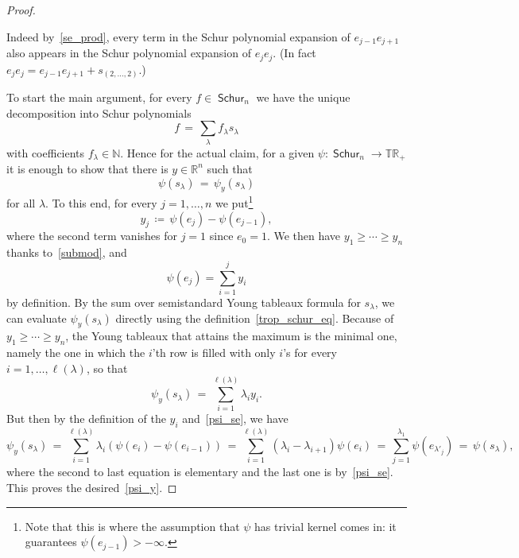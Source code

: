 \documentclass[11pt]{article}
\theoremstyle{definition}
\numberwithin{equation}{section}
\newcommand{\N}{\mathbb{N}}
\newcommand{\R}{\mathbb{R}}
\newcommand{\TR}{\mathbb{TR}}
\DeclareMathOperator{\Schur}{\mathsf{Schur}}
\begin{document}
\begin{proof}
\begin{itemize}
			Indeed by~\eqref{se_prod}, every term in the Schur polynomial expansion of $e_{j-1} e_{j+1}$ also appears in the Schur polynomial expansion of $e_j e_j$. (In fact $e_j e_j = e_{j-1} e_{j+1} + s_{\scriptstyle{(2,\ldots,2)}}$.)
	\end{itemize}
	To start the main argument, for every $f \in \Schur_n$ we have the unique decomposition into Schur polynomials
	\[
		f \,=\, \sum_\lambda f_\lambda s_\lambda
	\]
	with coefficients $f_\lambda \in \N$. Hence for the actual claim, for a given $\psi : \Schur_n \to \TR_+$ it is enough to show that there is $y \in \R^n$ such that
	\begin{equation}
		\label{psi_y}
		\psi(s_\lambda) \,=\, \psi_y(s_\lambda)
	\end{equation}
	for all $\lambda$. To this end, for every $j = 1,\ldots,n$ we put\footnote{Note that this is where the assumption that $\psi$ has trivial kernel comes in: it guarantees $\psi(e_{j-1}) > -\infty$.}
	\[
		y_j \,\coloneqq\, \psi(e_j) - \psi(e_{j-1}),
	\]
	where the second term vanishes for $j = 1$ since $e_0 = 1$.
	We then have $y_1 \ge \cdots \ge y_n$ thanks to~\eqref{submod}, and
	\begin{equation}
		\label{psiey}
		\psi(e_j) = \sum_{i=1}^j y_i
	\end{equation}
	by definition.
	By the sum over semistandard Young tableaux formula for $s_\lambda$, we can evaluate $\psi_y(s_\lambda)$ directly using the definition~\eqref{trop_schur_eq}.
	Because of $y_1 \ge \cdots \ge y_n$, the Young tableaux that attains the maximum is the minimal one, namely the one in which the $i$'th row is filled with only $i$'s for every $i = 1,\ldots,\ell(\lambda)$, so that
	\[
		\psi_y(s_\lambda) \,=\, \sum_{i=1}^{\ell(\lambda)} \lambda_i y_i.
	\]
	But then by the definition of the $y_i$ and~\eqref{psi_se}, we have
	\[
		\psi_y(s_\lambda) \,=\, \sum_{i=1}^{\ell(\lambda)} \lambda_i (\psi(e_i) - \psi(e_{i-1})) \,=\, \sum_{i=1}^{\ell(\lambda)} (\lambda_i - \lambda_{i+1}) \psi(e_i) \,=\, \sum_{j=1}^{\lambda_1} \psi(e_{\lambda'_j}) \,=\, \psi(s_\lambda),
	\]
	where the second to last equation is elementary and the last one is by~\eqref{psi_se}.
	This proves the desired~\eqref{psi_y}.
\end{proof}
\end{document}
